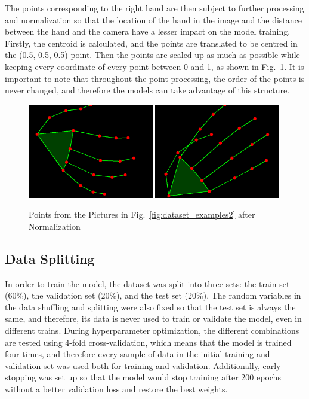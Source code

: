 The points corresponding to the right hand are then subject to further processing and normalization so that the location of the hand in the image and the distance between the hand and the camera have a lesser impact on the model training. Firstly, the centroid is calculated, and the points are translated to be centred in the (0.5, 0.5, 0.5) point. Then the points are scaled up as much as possible while keeping every coordinate of every point between 0 and 1, as shown in Fig.~\ref{fig:dataset_examples3}. It is important to note that throughout the point processing, the order of the points is never changed, and therefore the models can take advantage of this structure.

\begin{figure}[H]
    \centerline{\includegraphics[width=0.49\textwidth]{figs/dataset_preprocessing3_1.png} \includegraphics[width=0.49\textwidth]{figs/dataset_preprocessing3_2.png}}
    \caption[Points from the Pictures in Fig.~\ref{fig:dataset_examples2} after Normalization]{Points from the Pictures in Fig.~\ref{fig:dataset_examples2} after Normalization}
    \label{fig:dataset_examples3}
\end{figure}

\subsection{Data Splitting}

In order to train the model, the dataset was split into three sets: the train set (60\%), the validation set (20\%), and the test set (20\%). The random variables in the data shuffling and splitting were also fixed so that the test set is always the same, and therefore, its data is never used to train or validate the model, even in different trains. During hyperparameter optimization, the different combinations are tested using 4-fold cross-validation, which means that the model is trained four times, and therefore every sample of data in the initial training and validation set was used both for training and validation. Additionally, early stopping was set up so that the model would stop training after 200 epochs without a better validation loss and restore the best weights.

